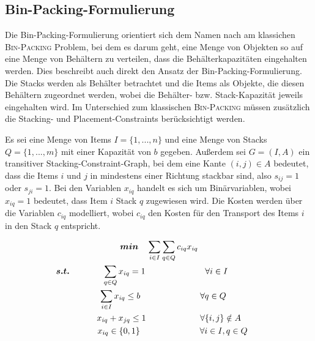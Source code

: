 \subsection{Bin-Packing-Formulierung}
\label{sec:bin_packing_formulation}

Die Bin-Packing-Formulierung orientiert sich dem Namen nach am klassichen \textsc{Bin-Packing} Problem, bei dem es darum geht,
eine Menge von Objekten so auf eine Menge von Behältern zu verteilen, dass die Behälterkapazitäten eingehalten werden.
Dies beschreibt auch direkt den Ansatz der Bin-Packing-Formulierung. Die Stacks werden als Behälter betrachtet und die Items als Objekte,
die diesen Behältern zugeordnet werden, wobei die Behälter- bzw. Stack-Kapazität jeweils eingehalten wird. Im Unterschied zum klassischen \textsc{Bin-Packing} müssen zusätzlich die Stacking- und Placement-Constraints berücksichtigt werden.

\pagebreak

Es sei eine Menge von Items $I = \{1, ..., n\}$ und eine Menge von Stacks $Q = \{1, ..., m\}$ mit einer Kapazität von $b$ gegeben.
Außerdem sei $G = (I, A)$ ein transitiver Stacking-Constraint-Graph, bei dem eine Kante $(i, j) \in A$ bedeutet,
dass die Items $i$ und $j$ in mindestens einer Richtung stackbar sind, also $s_{ij} = 1$ oder $s_{ji} = 1$.\newline
Bei den Variablen $x_{iq}$ handelt es sich um Binärvariablen, wobei $x_{iq} = 1$ bedeutet, dass Item $i$ Stack $q$ zugewiesen wird.
Die Kosten werden über die Variablen $c_{iq}$ modelliert, wobei $c_{iq}$ den Kosten für den Transport des Items $i$ in den Stack $q$
entspricht.

\begin{gather}
\boldsymbol{min} \quad \sum_{i \in I} \sum_{q \in Q} c_{iq} x_{iq} \label{bin_packing_line_one} \\
\thinspace\thinspace \boldsymbol{s.t.} \thinspace\quad\thinspace\thinspace\thinspace\quad\thinspace \quad \sum_{q \in Q} x_{iq} = 1 \quad\quad\quad\quad\quad\quad\quad \forall i \in I \quad\quad\quad\quad\thinspace\thinspace \label{bin_packing_line_two} \\
\quad \sum_{i \in I} x_{iq} \leq b \quad\quad\quad\quad\quad\quad\quad \forall q \in Q \label{bin_packing_line_three} \\
\thinspace\thinspace\quad\quad x_{iq} + x_{jq} \leq 1 \quad\quad\thinspace\thinspace\quad\quad\quad\quad \forall \{i, j\} \notin A \label{bin_packing_line_four} \\
\thinspace\thinspace\quad\quad\quad x_{iq} \in \{0, 1\} \thinspace\thinspace\thinspace\thinspace\thinspace\thinspace\quad\quad\quad\quad\quad\quad \forall i \in I, q \in Q \thinspace \label{bin_packing_line_five}
\end{gather}

